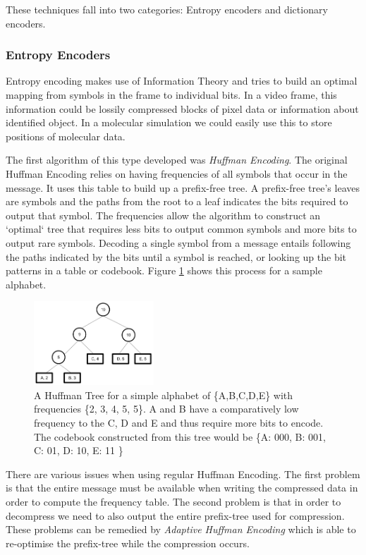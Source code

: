 \documentclass[a4paper,11pt]{report}
\begin{document}
These techniques fall into two categories: Entropy encoders and dictionary encoders. 

\subsubsection{Entropy Encoders}

Entropy encoding makes use of Information Theory and tries to build an optimal mapping from symbols in the frame to individual bits. In a video frame, this information could be lossily compressed blocks of pixel data or information about identified object. In a molecular simulation we could easily use this to store positions of molecular data.

The first algorithm of this type developed was \emph{Huffman Encoding}\cite{citeulike:1320251}. The original Huffman Encoding relies on having frequencies of all symbols that occur in the message. It uses this table to build up a prefix-free tree. A prefix-free tree's leaves are symbols and the paths from the root to a leaf indicates the bits required to output that symbol. The frequencies allow the algorithm to construct an `optimal` tree that requires less bits to output common symbols and more bits to output rare symbols. Decoding a single symbol from a message  entails following the paths indicated by the bits until a symbol is reached, or looking up the bit patterns in a table or codebook. Figure \ref{huffman} shows this process for a sample alphabet.

\begin{figure}[!h]
 \center
 \includegraphics[width=0.4\textwidth]{resources/HuffmanTreeCropped.png}
\caption{A Huffman Tree for a simple alphabet of \{A,B,C,D,E\} with frequencies \{2, 3, 4, 5, 5\}. A and B have a comparatively low frequency to the C, D and E and thus require more bits to encode. The codebook constructed from this tree would be \{A: 000, B: 001, C: 01, D: 10, E: 11 \}}
\label{huffman}
\end{figure}

There are various issues when using regular Huffman Encoding. The first problem is that the entire message must be available when writing the compressed data in order to compute the frequency table.\cite{RefWorks:1} The second problem is that in order to decompress we need to also output the entire prefix-tree used for compression. These problems can be remedied by \emph{Adaptive Huffman Encoding}\cite{42227} which is able to re-optimise the prefix-tree while the compression occurs.
\end{document}
